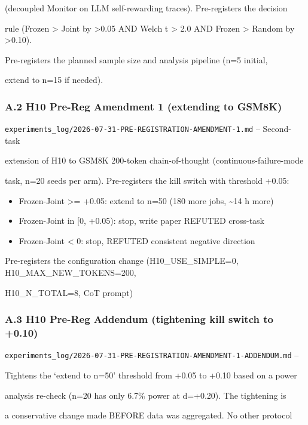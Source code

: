 \documentclass[11pt]{article}
\begin{document}
(decoupled Monitor on LLM self-rewarding traces). Pre-registers the
decision

rule (Frozen \textgreater{} Joint by \textgreater0.05 AND Welch t
\textgreater{} 2.0 AND Frozen \textgreater{} Random by
\textgreater0.10).

Pre-registers the planned sample size and analysis pipeline (n=5
initial,

extend to n=15 if needed).

\subsubsection{A.2 H10 Pre-Reg Amendment 1 (extending to
GSM8K)}\label{a.2-h10-pre-reg-amendment-1-extending-to-gsm8k}

\texttt{experiments\_log/2026-07-31-PRE-REGISTRATION-AMENDMENT-1.md} --
Second-task

extension of H10 to GSM8K 200-token chain-of-thought
(continuous-failure-mode

task, n=20 seeds per arm). Pre-registers the kill switch with threshold
+0.05:

\begin{itemize}
\item
  Frozen-Joint \textgreater= +0.05: extend to n=50 (180 more jobs,
  \textasciitilde14 h more)
\item
  Frozen-Joint in {[}0, +0.05): stop, write paper REFUTED cross-task
\item
  Frozen-Joint \textless{} 0: stop, REFUTED consistent negative
  direction
\end{itemize}

Pre-registers the configuration change (H10\_USE\_SIMPLE=0,
H10\_MAX\_NEW\_TOKENS=200,

H10\_N\_TOTAL=8, CoT prompt)

\subsubsection{A.3 H10 Pre-Reg Addendum (tightening kill switch to
+0.10)}\label{a.3-h10-pre-reg-addendum-tightening-kill-switch-to-0.10}

\texttt{experiments\_log/2026-07-31-PRE-REGISTRATION-AMENDMENT-1-ADDENDUM.md}
--

Tightens the `extend to n=50' threshold from +0.05 to +0.10 based on a
power

analysis re-check (n=20 has only 6.7\% power at d=+0.20). The tightening
is

a conservative change made BEFORE data was aggregated. No other protocol
\end{document}
